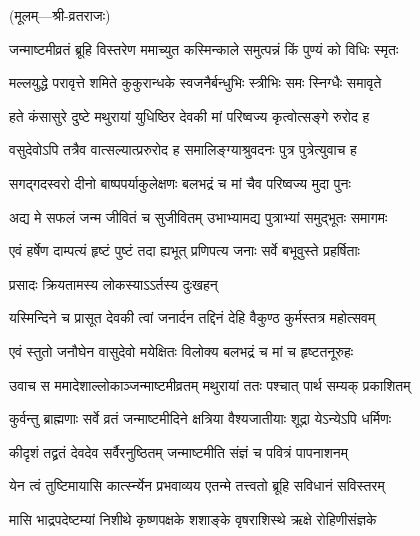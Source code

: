 \begingroup
\setlength{\parindent}{0pt}
\centerline{\small{(मूलम्—श्री-व्रतराजः)}}


\twolineshloka
{जन्माष्टमीव्रतं ब्रूहि विस्तरेण ममाच्युत}
{कस्मिन्काले समुत्पन्नं किं पुण्यं को विधिः स्मृतः}%

\twolineshloka
{मल्लयुद्धे परावृत्ते शमिते कुकुरान्धके}
{स्वजनैर्बन्धुभिः स्त्रीभिः समः स्निग्धैः समावृते}%

\twolineshloka
{हते कंसासुरे दुष्टे मथुरायां युधिष्ठिर}
{देवकी मां परिष्वज्य कृत्वोत्सङ्गे रुरोद ह}%

\twolineshloka
{वसुदेवोऽपि तत्रैव वात्सल्यात्प्ररुरोद ह}
{समालिङ्ग्याश्रुवदनः पुत्र पुत्रेत्युवाच ह}%

\twolineshloka
{सगद्गदस्वरो दीनो बाष्पपर्याकुलेक्षणः}
{बलभद्रं च मां चैव परिष्वज्य मुदा पुनः}%

\twolineshloka
{अद्य मे सफलं जन्म जीवितं च सुजीवितम्}
{उभाभ्यामद्य पुत्राभ्यां समुद्भूतः समागमः}%

\twolineshloka
{एवं हर्षेण दाम्पत्यं हृष्टं पुष्टं तदा ह्यभूत्}
{प्रणिपत्य जनाः सर्वे बभूवुस्ते प्रहर्षिताः}%

\onelineshloka
{प्रसादः क्रियतामस्य लोकस्याऽऽर्तस्य दुःखहन्}%

\twolineshloka
{यस्मिन्दिने च प्रासूत देवकी त्वां जनार्दन}
{तद्दिनं देहि वैकुण्ठ कुर्मस्तत्र महोत्सवम्}%

\twolineshloka
{एवं स्तुतो जनौघेन वासुदेवो मयेक्षितः}
{विलोक्य बलभद्रं च मां च हृष्टतनूरुहः}%

\twolineshloka
{उवाच स ममादेशाल्लोकाञ्जन्माष्टमीव्रतम्}
{मथुरायां ततः पश्चात् पार्थ सम्यक् प्रकाशितम्}%

\twolineshloka
{कुर्वन्तु ब्राह्मणाः सर्वे व्रतं जन्माष्टमीदिने}
{क्षत्रिया वैश्यजातीयाः शूद्रा येऽन्येऽपि धर्मिणः}%

\twolineshloka
{कीदृशं तद्व्रतं देवदेव सर्वैरनुष्ठितम्}
{जन्माष्टमीति संज्ञं च पवित्रं पापनाशनम्}%

\twolineshloka
{येन त्वं तुष्टिमायासि कार्त्स्न्येन प्रभवाव्यय}
{एतन्मे तत्त्वतो ब्रूहि सविधानं सविस्तरम्}%

\twolineshloka
{मासि भाद्रपदेष्टम्यां निशीथे कृष्णपक्षके}
{शशाङ्के वृषराशिस्थे ऋक्षे रोहिणीसंज्ञके}%

